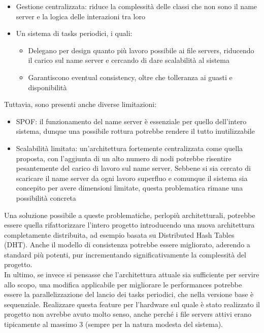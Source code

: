 \documentclass[a4paper, 12pt]{scrreprt}
\begin{document}
        \begin{itemize}

            \item Gestione centralizzata: riduce la complessità delle classi che non sono il name server e la logica delle interazioni tra loro

            \item Un sistema di tasks periodici, i quali:

            \begin{itemize}

                \item Delegano per design quanto più lavoro possibile ai file servers, riducendo il carico sul name server e cercando di dare scalabilità al sistema

                \item Garantiscono eventual consistency, oltre che tolleranza ai guasti e disponibilità

            \end{itemize}

        \end{itemize}

        Tuttavia, sono presenti anche diverse limitazioni:

        \begin{itemize}

            \item SPOF: il funzionamento del name server è essenziale per quello dell'intero sistema, dunque una possibile rottura potrebbe rendere il tutto inutilizzabile

            \item Scalabilità limitata: un'architettura fortemente centralizzata come quella proposta, con l'aggiunta di un alto numero di nodi potrebbe risentire pesantemente del carico di lavoro sul name server. Sebbene si sia cercato di scaricare il name server da ogni lavoro superfluo e comunque il sistema sia concepito per avere dimensioni limitate, questa problematica rimane una possibilità concreta

        \end{itemize}

        Una soluzione possibile a queste problematiche, perlopiù architetturali, potrebbe essere quella rifattorizzare l'intero progetto introducendo una nuova architettura completamente distribuita, ad esempio basata su Distributed Hash Tables (DHT). Anche il modello di consistenza potrebbe essere migliorato, aderendo a standard più potenti, pur incrementando significativamente la complessità del progetto.\\
        In ultimo, se invece si pensasse che l'architettura attuale sia sufficiente per servire allo scopo, una modifica applicabile per migliorare le performances potrebbe essere la parallelizzazione del lancio dei tasks periodici, che nella versione base è sequenziale. Realizzare questa feature per l'hardware sul quale è stato realizzato il progetto non avrebbe avuto molto senso, anche perché i file servers attivi erano tipicamente al massimo 3 (sempre per la natura modesta del sistema).
\end{document}
